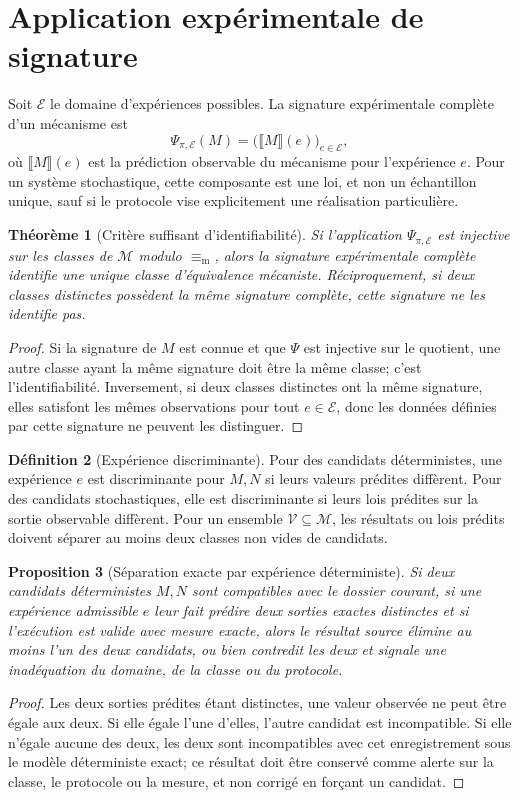 \documentclass[11pt,oneside]{book}
\newtheorem{theoreme}{Théorème}[chapter]
\newtheorem{proposition}[theoreme]{Proposition}
\theoremstyle{definition}
\newtheorem{definition}[theoreme]{Définition}
\theoremstyle{remark}
\newcommand{\Mcal}{\mathcal M}
\newcommand{\1}{\mathbf 1}
\newcommand{\sem}[1]{\llbracket #1 \rrbracket}
\newcommand{\MechEq}{\equiv_{\mathrm m}}
\begin{document}
\section{Application expérimentale de signature}
Soit $\mathcal E$ le domaine d'expériences possibles. La signature expérimentale complète d'un mécanisme est
\[
\Psi_{\pi,\mathcal E}(M)=\bigl(\sem{M}(e)\bigr)_{e\in\mathcal E},
\]
où $\sem{M}(e)$ est la prédiction observable du mécanisme pour l'expérience $e$. Pour un système stochastique, cette composante est une loi, et non un échantillon unique, sauf si le protocole vise explicitement une réalisation particulière.

\begin{theoreme}[Critère suffisant d'identifiabilité]
Si l'application $\Psi_{\pi,\mathcal E}$ est injective sur les classes de $\Mcal$ modulo $\MechEq$, alors la signature expérimentale complète identifie une unique classe d'équivalence mécaniste. Réciproquement, si deux classes distinctes possèdent la même signature complète, cette signature ne les identifie pas.
\end{theoreme}
\begin{proof}
Si la signature de $M$ est connue et que $\Psi$ est injective sur le quotient, une autre classe ayant la même signature doit être la même classe; c'est l'identifiabilité. Inversement, si deux classes distinctes ont la même signature, elles satisfont les mêmes observations pour tout $e\in\mathcal E$, donc les données définies par cette signature ne peuvent les distinguer.\end{proof}

\begin{definition}[Expérience discriminante]
Pour des candidats déterministes, une expérience $e$ est discriminante pour $M,N$ si leurs valeurs prédites diffèrent. Pour des candidats stochastiques, elle est discriminante si leurs lois prédites sur la sortie observable diffèrent. Pour un ensemble $\mathcal V\subseteq\Mcal$, les résultats ou lois prédits doivent séparer au moins deux classes non vides de candidats.
\end{definition}

\begin{proposition}[Séparation exacte par expérience déterministe]
Si deux candidats déterministes $M,N$ sont compatibles avec le dossier courant, si une expérience admissible $e$ leur fait prédire deux sorties exactes distinctes et si l'exécution est valide avec mesure exacte, alors le résultat source élimine au moins l'un des deux candidats, ou bien contredit les deux et signale une inadéquation du domaine, de la classe ou du protocole.
\end{proposition}
\begin{proof}
Les deux sorties prédites étant distinctes, une valeur observée ne peut être égale aux deux. Si elle égale l'une d'elles, l'autre candidat est incompatible. Si elle n'égale aucune des deux, les deux sont incompatibles avec cet enregistrement sous le modèle déterministe exact; ce résultat doit être conservé comme alerte sur la classe, le protocole ou la mesure, et non corrigé en forçant un candidat.\end{proof}
\end{document}
